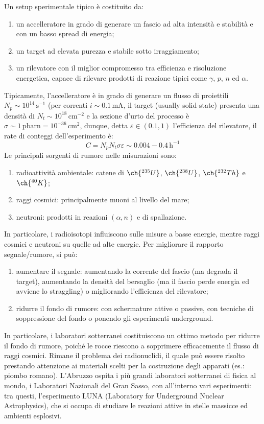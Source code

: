 Un setup sperimentale tipico è costituito da:
\begin{enumerate}
	\item un accelleratore in grado di generare un fascio ad alta intensità e stabilità e con un basso spread di energia;
	\item un target ad elevata purezza e stabile sotto irraggiamento;
	\item un rilevatore con il miglior compromesso tra efficienza e risoluzione energetica, capace di rilevare prodotti di reazione tipici come $ \gamma $, $ p $, $ n $ ed $ \alpha $.
\end{enumerate}
Tipicamente, l'accelleratore è in grado di generare un flusso di proiettili $ N_p \sim 10^{14} \,\text{s}^{-1} $ (per correnti $ i \sim 0.1 \,\text{mA} $, il target (usually solid-state) presenta una densità di $ N_t \sim 10^{18} \,\text{cm}^{-2} $ e la sezione d'urto del processo è $ \sigma \sim 1 \,\text{pbarn} = 10^{-36}  \,\text{cm}^2 $, dunque, detta $ \varepsilon \in \left( 0.1 , 1 \right) $ l'efficienza del rilevatore, il rate di conteggi dell'esperimento è:
\begin{equation*}
	C = N_p N_t \sigma \varepsilon \sim 0.004 - 0.4 \,\text{h}^{-1}
\end{equation*}
Le principali sorgenti di rumore nelle misurazioni sono:
\begin{enumerate}
	\item radioattività ambientale: catene di $ \ch{^{235} U} $, $ \ch{^{238} U} $, $ \ch{^{232} Th} $ e $ \ch{^{40} K} $;
	\item raggi cosmici: principalmente muoni al livello del mare;
	\item neutroni: prodotti in reazioni $ \left( \alpha, n \right) $ e di spallazione.
\end{enumerate}
In particolare, i radioisotopi influiscono sulle misure a basse energie, mentre raggi cosmici e neutroni su quelle ad alte energie. Per migliorare il rapporto segnale/rumore, si può:
\begin{enumerate}
	\item aumentare il segnale: aumentando la corrente del fascio (ma degrada il target), aumentando la densità del bersaglio (ma il fascio perde energia ed avviene lo straggling) o migliorando l'efficienza del rilevatore;
	\item ridurre il fondo di rumore: con schermature attive o passive, con tecniche di soppressione del fondo o ponendo gli esperimenti underground.
\end{enumerate}
In particolare, i laboratori sotterranei costituiscono un ottimo metodo per ridurre il fondo di rumore, poiché le rocce riescono a sopprimere efficacemente il flusso di raggi cosmici. Rimane il problema dei radionuclidi, il quale può essere risolto prestando attenzione ai materiali scelti per la costruzione degli apparati (es.: piombo romano). L'Abruzzo ospita i più grandi laboratori sotterranei di fisica al mondo, i Laboratori Nazionali del Gran Sasso, con all'interno vari esperimenti: tra questi, l'esperimento LUNA (Laboratory for Underground Nuclear Astrophysics), che si occupa di studiare le reazioni attive in stelle massicce ed ambienti esplosivi.

